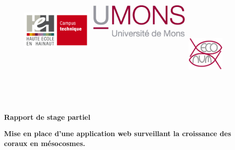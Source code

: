 \documentclass[]{report}
\title{}
\author{}
\date{}
\begin{document}
\begin{centering}

\begin{figure}

\includegraphics[width=3.5cm, height=6cm]{../image/technique-logo.jpg} 
\includegraphics[width=5cm,height=7cm]{../image/UMONS-logo.jpg}
\includegraphics[width=1.8cm,height=3.5cm]{../image/ECONUM-logo.pdf}

\end{figure}

\textcolor{white}{.}

\vspace{2.5 cm}

\Huge

{\bf Rapport de stage partiel}

\vspace{1 cm}

\huge 
{\bf Mise en place d'une application web surveillant la croissance des coraux en mésocosmes.}
\vspace{1 cm}


\end{centering}
\end{document}

